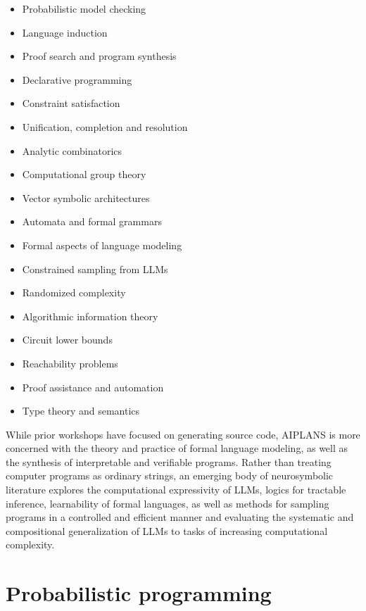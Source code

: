 \documentclass{article}
\begin{document}
    \begin{multicols}{2}
     \begin{itemize}
        \item Probabilistic model checking
        \item Language induction
        \item Proof search and program synthesis
        \item Declarative programming
        \item Constraint satisfaction
        \item Unification, completion and resolution
        \item Analytic combinatorics
        \item Computational group theory
        \item Vector symbolic architectures
        \item Automata and formal grammars
        \item Formal aspects of language modeling~\cite{cotterell2023formal}
        \item Constrained sampling from LLMs
        \item Randomized complexity
        \item Algorithmic information theory
        \item Circuit lower bounds
        \item Reachability problems
        \item Proof assistance and automation
        \item Type theory and semantics
    \end{itemize}
    \end{multicols}

    While prior workshops have focused on generating source code, AIPLANS is more concerned with the theory and practice of formal language modeling, as well as the synthesis of interpretable and verifiable programs. Rather than treating computer programs as ordinary strings, an emerging body of neurosymbolic literature explores the computational expressivity of LLMs, logics for tractable inference, learnability of formal languages, as well as methods for sampling programs in a controlled and efficient manner and evaluating the systematic and compositional generalization of LLMs to tasks of increasing computational complexity.

    \section*{Probabilistic programming}
\end{document}
